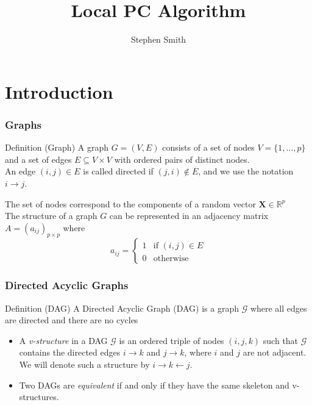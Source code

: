 \documentclass{beamer}
\title{Local PC Algorithm}
\author{Stephen Smith}
\institute[UCLA]{University of California, Los Angeles}
\begin{document}
\frame{\titlepage}

\frame{\tableofcontents}

\section{Introduction}


\begin{frame}
\frametitle{Graphs}

\begin{exampleblock}{Definition (Graph)}
A graph $G = (V,E)$ consists of a set of nodes $V = \{1,\ldots,p\}$ and a set of edges $E \subseteq V \times V$ with ordered pairs of distinct nodes.\\
\vspace{10pt}
An edge $(i,j) \in E$ is called directed if $(j,i) \notin E$, and we use the notation $i \rightarrow j$.
\end{exampleblock}

The set of nodes correspond to the components of a random vector $\mathbf{X} \in \mathbb{R}^p$ \\
\vspace{10pt}
The structure of a graph $G$ can be represented in an adjacency matrix $A = (a_{ij})_{p \times p}$ where
$$ a_{ij} = 
\begin{cases}
1 & \textrm{if $(i,j) \in E$} \\
0 & \textrm{otherwise}
\end{cases}
$$
 
\end{frame}

\begin{frame}
\frametitle{ Directed Acyclic Graphs  }
\begin{exampleblock}{ Definition (DAG) }
A Directed Acyclic Graph (DAG) is a graph $\mathcal{G}$ where all edges are directed and there are no cycles
\end{exampleblock}

\begin{itemize}
\item A \textit{v-structure} in a DAG $\mathcal{G}$ is an ordered triple of nodes $(i,j,k)$ such that $\mathcal{G}$ contains the directed edges $i \rightarrow k$ and $j \rightarrow k$, where $i$ and $j$ are not adjacent. We will denote such a structure by $i \rightarrow k \leftarrow j$.
\item Two DAGs are \textit{equivalent} if and only if they have the same skeleton and v-structures.
\end{itemize}

\end{frame}
\end{document}
